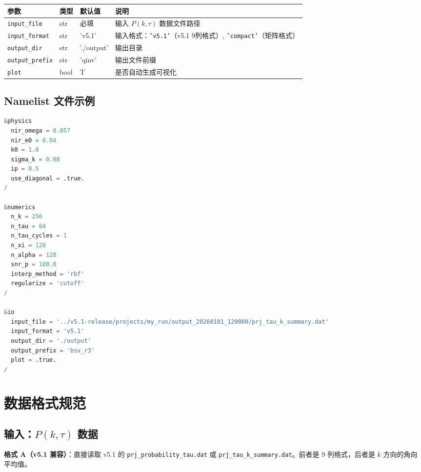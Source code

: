\documentclass[11pt,a4paper]{ctexart}
\begin{document}
\begin{paramtable}
\begin{longtable}{p{2.8cm}p{1.5cm}p{2cm}p{5.5cm}}
\toprule
\textbf{参数} & \textbf{类型} & \textbf{默认值} & \textbf{说明} \\
\midrule
\texttt{input\_file}      & str & 必填 & 输入 $P(k,\tau)$ 数据文件路径 \\
\texttt{input\_format}    & str & 'v5.1' & 输入格式：\texttt{'v5.1'}（v5.1 9列格式）,
                                          \texttt{'compact'}（矩阵格式） \\
\texttt{output\_dir}      & str & './output' & 输出目录 \\
\texttt{output\_prefix}   & str & 'qinv' & 输出文件前缀 \\
\texttt{plot}             & bool& T & 是否自动生成可视化 \\
\bottomrule
\end{longtable}
\end{paramtable}

\subsection{Namelist 文件示例}

\begin{lstlisting}[language=Python, caption=典型的 \texttt{qinv.nml} 配置文件, label=lst:namelist]
&physics
  nir_omega = 0.057
  nir_e0 = 0.04
  k0 = 1.0
  sigma_k = 0.08
  ip = 0.5
  use_diagonal = .true.
/

&numerics
  n_k = 256
  n_tau = 64
  n_tau_cycles = 1
  n_xi = 128
  n_alpha = 128
  snr_p = 100.0
  interp_method = 'rbf'
  regularize = 'cutoff'
/

&io
  input_file = '../v5.1-release/projects/my_run/output_20260101_120000/prj_tau_k_summary.dat'
  input_format = 'v5.1'
  output_dir = './output'
  output_prefix = 'bsv_r3'
  plot = .true.
/
\end{lstlisting}

\section{数据格式规范}

\subsection{输入：$P(k,\tau)$ 数据}

\textbf{格式 A（v5.1 兼容）}：直接读取 v5.1 的 \texttt{prj\_probability\_tau.dat} 或
\texttt{prj\_tau\_k\_summary.dat}。前者是 9 列格式，后者是 $k$ 方向的角向平均值。
\end{document}
